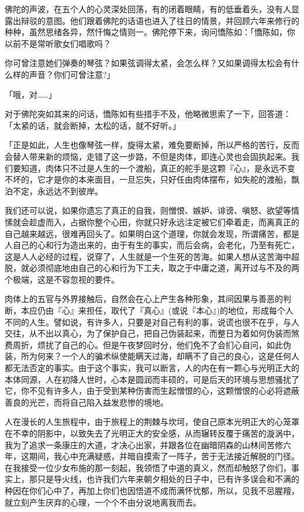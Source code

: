 \documentclass[12pt,twoside,openany]{book}
\begin{document}
佛陀的声波，在五个人的心灵深处回荡，有的闭着眼睛，有的低垂着头，没有人显露出辩驳的意图。他们跟着佛陀的话语也进入了往日的情景，并回顾六年来修行的种种，虽然思绪各异，然忏悔之情则一。佛陀停下来，询问憍陈如：「憍陈如，你以前不是常听歌女们唱歌吗？

你可曾注意她们弹奏的琴弦？如果弦调得太紧，会怎么样？又如果调得太松会有什么样的声音？你们可曾注意?」

「哦，对……」

对于佛陀突如其来的问话，憍陈如有些措手不及，他略微思索了一下，回答道：「太紧的话，就会断掉，太松的话，就不好听。」

「正是如此，人生也像琴弦一样，旋得太紧，难免要断掉，所以严格的苦行，反而会替人带来新的烦恼，走错了这一步路，不但是肉体，即连心灵也会固执起来。我们要知道，肉体只不过是人生的一个渡船，真正的舵手是这颗『心』，是永远不变不坏的，它才是你的本来面目，一旦忘失，只好任由肉体摆布，如失舵的渡船，飘泊不定，永远达不到彼岸。

我们还可以说，如果你遗忘了真正的自我，则憎恨、嫉妒、诽谤、嗔怒、欲望等情愫就会趁虚而入，占据你整个心田，你就只好永远注定被它们牵着走，而离真正的自己越来越远，很难再回头了。如果明白这个道理，你就会发现，所谓痛苦，都是人自己的心和行为造出来的，由于有生的事实，而后会病，会老化，乃至有死亡，这是人人必经的过程，说穿了，人生就是一个生死的苦海。如果人想从这苦海中超脱，就必须彻底地由自己的心和行为下工夫，取之于中庸之道，离开过与不及的两个极端，这是不容忽视的要件。

肉体上的五官与外界接触后，自然会在心上产生各种形象，其间因果与善恶的判断，本应仍由『心』来担任，取代了『真心』(或说『本心』)的地位，形成每个人不同的人生。譬如说，有许多人，只要是对自己有利的事，说谎也很不在乎，与人交往，从不出以真心，为了保护自己，把自己伪装起来，而整日为着如何伪装而煞费周折，烦扰了自己的心。但是午夜梦回时分，他们免不了会扪心自问，如此伪装，所为何来？一个人的骗术纵使能瞒天过海，却瞒不了自己的良心，这是任何人都无法否定的事实。由于这个事实，我可以断言，人的内在有一颗心与光明正大的本体同源，人在初降人世时，心本是圆润而丰硕的，可是后天的环境与思想骚扰了它，你不见有许多人，由于受到某种伤害而生起憎恨的心，这颗憎恨的心必将遮蔽善良的光芒，而将自己陷入益发悲惨的境地。

人在漫长的人生旅程中，由于旅程上的荆棘与坎坷，使自己原本光明正大的心笼罩在不幸的阴影中，以致失去了光明正大的安全感，从而辗转反覆于痛苦的漩涡中，我为了追求一条康庄的大道，才决心出家，并跟各位在幽暗阴森的山林间苦修六年，这期间，我心中充满疑惑，并暗自摸索了一阵子，苦于无法接近解脱的门径。在我接受一位少女布施的那一刻起，我领悟了中道的真义，然而却触怒了你们，事实上，那只是导火线，也许我们六年来朝夕相处的日子中，已有许多误会和不满的种因在你们心中了，再加上你们也因悟道不成而满怀忧郁，所以，见我不忌腥羶，就立刻产生厌弃的心理，一个个不由分说地离我而去。
\end{document}
